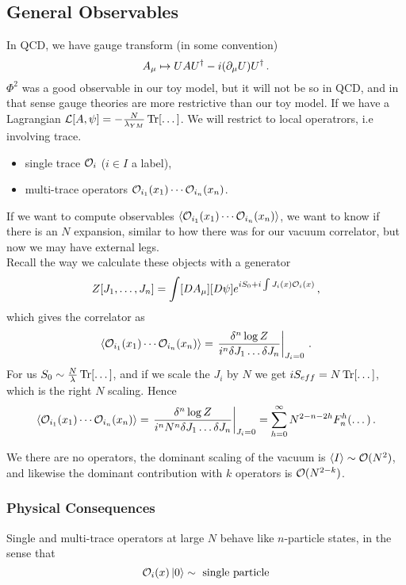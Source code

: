 \documentclass{article}
\begin{document}
\subsection{General Observables}
In QCD, we have gauge transform (in some convention)
\[
A_\mu \mapsto UAU^\dagger -i(\partial_\mu U)U^\dagger \, .
\]
$\Phi^2$ was a good observable in our toy model, but it will not be so in QCD, and in that sense gauge theories are more restrictive than our toy model. If we have a Lagrangian $\mathcal{L}[A, \psi] = -\frac{N}{\lambda_{YM}} \operatorname{Tr}[\dots]$. We will restrict to local operatrors, i.e involving trace. 
\begin{itemize}
	\item single trace $\mathcal{O}_i$ ($i \in I$ a label), 
	\item multi-trace operators $\mathcal{O}_{i_1}(x_1) \cdots \mathcal{O}_{i_n}(x_n)$. 
\end{itemize}
If we want to compute observables $\left\langle \mathcal{O}_{i_1}(x_1) \cdots \mathcal{O}_{i_n}(x_n) \right\rangle$, we want to know if there is an $N$ expansion, similar to how there was for our vacuum correlator, but now we may have external legs. \\
Recall the way we calculate these objects with a generator 
\[
Z[J_1, \dots, J_n] = \int [DA_\mu] [D\psi] e^{i S_0 + i \int J_i(x) \mathcal{O}_i(x)} \, ,
\]
which gives the correlator as 
\[
\left\langle \mathcal{O}_{i_1}(x_1) \cdots \mathcal{O}_{i_n}(x_n) \right\rangle = \left. \frac{\delta^n \log Z}{i^n \delta J_1 \dots \delta J_n} \right\rvert_{J_i = 0} \, .
\]
For us $S_0 \sim \frac{N}{\lambda} \operatorname{Tr}[\dots]$, and if we scale the $J_i$ by $N$ we get $iS_{eff} = N \operatorname{Tr}[\dots]$, which is the right $N$ scaling. Hence 
\[
\left\langle \mathcal{O}_{i_1}(x_1) \cdots \mathcal{O}_{i_n}(x_n) \right\rangle = \left. \frac{\delta^n \log Z}{i^n N^n \delta J_1 \dots \delta J_n} \right\rvert_{J_i = 0} = \sum_{h=0}^\infty N^{2-n-2h} F_n^h(\dots) \, . 
\]
\begin{remark}
	We there are no operators, the dominant scaling of the vacuum is $\left\langle I \right\rangle \sim \mathcal{O}(N^2)$, and likewise the dominant contribution with $k$ operators is $\mathcal{O}(N^{2-k})$.  
\end{remark}

\subsubsection{Physical Consequences}
\begin{remark}
	Single and multi-trace operators at large $N$ behave like $n$-particle states, in the sense that 
	\[
	\mathcal{O}_i(x)\ket{0} \sim \text{ single particle}
	\]
\end{remark}
\end{document}
